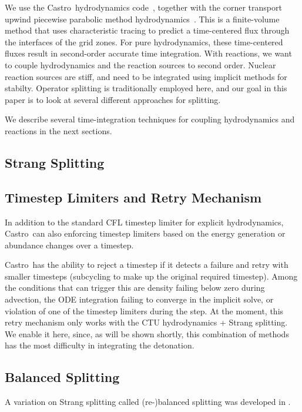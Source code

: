 \documentclass[times,modern]{aastex62}
\newcommand{\castro}{{\sf Castro}}
\begin{document}
We use the \castro\ hydrodynamics code~\cite{castro}, together with
the corner transport upwind piecewise parabolic method
hydrodynamics~\citep{millercolella:2002}.  This is a finite-volume
method that uses characteristic tracing to predict a time-centered
flux through the interfaces of the grid zones.  For pure
hydrodynamics, these time-centered fluxes result in second-order
accurate time integration.  With reactions, we want to couple
hydrodynamics and the reaction sources to second order.  Nuclear
reaction sources are stiff, and need to be integrated using implicit
methods for stabilty.  Operator splitting is traditionally employed
here, and our goal in this paper is to look at several different
approaches for splitting.

We describe several time-integration techniques for coupling
hydrodynamics and reactions in the next sections.


\subsection{Strang Splitting}


\subsection{Timestep Limiters and Retry Mechanism}

In addition to the standard CFL timestep limiter for explicit
hydrodynamics, \castro\ can also enforcing timestep limiters based on
the energy generation or abundance changes over a timestep.

\castro\ has the ability to reject a timestep if it detects a failure
and retry with smaller timesteps (subcycling to make up the original
required timestep).  Among the conditions that can trigger this are
density failing below zero during advection, the ODE integration
failing to converge in the implicit solve, or violation of one of the
timestep limiters during the step.  At the moment, this retry
mechanism only works with the CTU hydrodynamics + Strang splitting.
We enable it here, since, as will be shown shortly, this combination
of methods has the most difficulty in integrating the detonation.

\subsection{Balanced Splitting}

A variation on Strang splitting called (re-)balanced splitting was
developed in \citet{speth:2013}.
\end{document}
